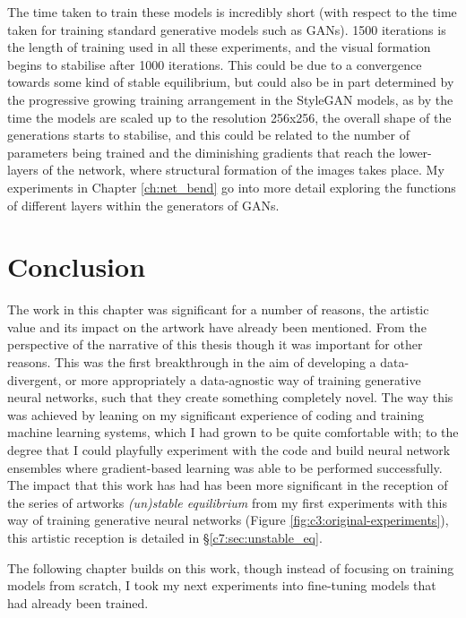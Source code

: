 The time taken to train these models is incredibly short (with respect to the time taken for training standard generative models such as GANs). 
1500 iterations is the length of training used in all these experiments, and the visual formation begins to stabilise after 1000 iterations. 
This could be due to a convergence towards some kind of stable equilibrium, but could also be in part determined by the progressive growing training arrangement in the StyleGAN models, as by the time the models are scaled up to the resolution 256x256, the overall shape of the generations starts to stabilise, and this could be related to the number of parameters being trained and the diminishing gradients that reach the lower-layers of the network, where structural formation of the images takes place.
My experiments in Chapter \ref{ch:net_bend} go into more detail exploring the functions of different layers within the generators of GANs. 


\section{Conclusion}

The work in this chapter was significant for a number of reasons, the artistic value and its impact on the artwork have already been mentioned. 
From the perspective of the narrative of this thesis though it was important for other reasons. 
This was the first breakthrough in the aim of developing a data-divergent, or more appropriately a data-agnostic way of training generative neural networks, such that they create something completely novel. 
The way this was achieved by leaning on my significant experience of coding and training machine learning systems, which I had grown to be quite comfortable with; to the degree that I could playfully experiment with the code and build neural network ensembles where gradient-based learning was able to be performed successfully.
The impact that this work has had has been more significant in the reception of the series of artworks \textit{(un)stable equilibrium} from my first experiments with this way of training generative neural networks (Figure \ref{fig:c3:original-experiments}), this artistic reception is detailed in \S \ref{c7:sec:unstable_eq}.

The following chapter builds on this work, though instead of focusing on training models from scratch, I took my next experiments into fine-tuning models that had already been trained.
